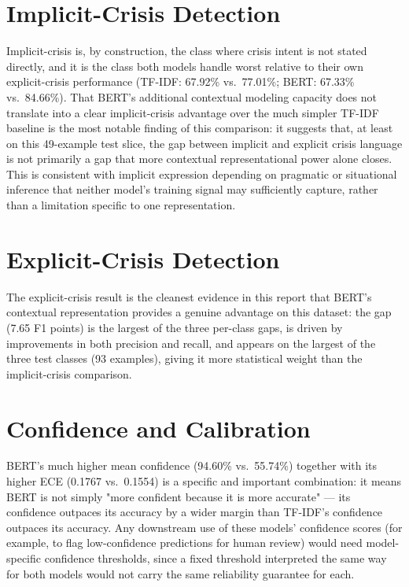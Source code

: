 \section{Implicit-Crisis Detection}

Implicit-crisis is, by construction, the class where crisis intent is not stated directly, and it is the class both models handle worst relative to their own explicit-crisis performance (TF-IDF: 67.92\% vs.\ 77.01\%; BERT: 67.33\% vs.\ 84.66\%). That BERT's additional contextual modeling capacity does not translate into a clear implicit-crisis advantage over the much simpler TF-IDF baseline is the most notable finding of this comparison: it suggests that, at least on this 49-example test slice, the gap between implicit and explicit crisis language is not primarily a gap that more contextual representational power alone closes. This is consistent with implicit expression depending on pragmatic or situational inference that neither model's training signal may sufficiently capture, rather than a limitation specific to one representation.

\section{Explicit-Crisis Detection}

The explicit-crisis result is the cleanest evidence in this report that BERT's contextual representation provides a genuine advantage on this dataset: the gap (7.65 F1 points) is the largest of the three per-class gaps, is driven by improvements in both precision and recall, and appears on the largest of the three test classes (93 examples), giving it more statistical weight than the implicit-crisis comparison.

\section{Confidence and Calibration}

BERT's much higher mean confidence (94.60\% vs.\ 55.74\%) together with its higher ECE (0.1767 vs.\ 0.1554) is a specific and important combination: it means BERT is not simply "more confident because it is more accurate" — its confidence outpaces its accuracy by a wider margin than TF-IDF's confidence outpaces its accuracy. Any downstream use of these models' confidence scores (for example, to flag low-confidence predictions for human review) would need model-specific confidence thresholds, since a fixed threshold interpreted the same way for both models would not carry the same reliability guarantee for each.

